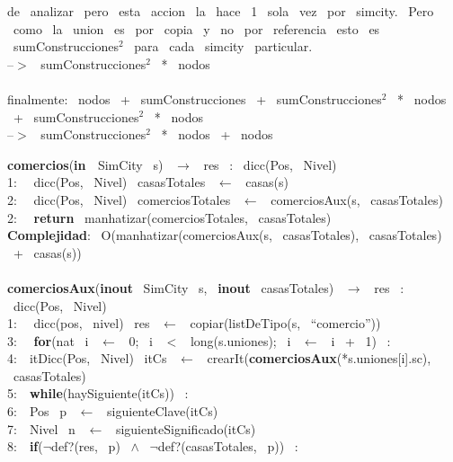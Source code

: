 \begin{Algoritmos}
    de \ analizar \ pero \ esta \ accion \ la \ hace \ 1 \ sola \ vez \ por \ simcity. \ Pero \ como \ la \ union \ es \ por \ copia \ y \ no \ por \
    referencia \ esto \ es \ sumConstrucciones$^2$ \ para \ cada \ simcity \ particular.\\
    --$>$ \ sumConstrucciones$^2$ \ * \ nodos\\
    \\
    finalmente: \ nodos \ + \ sumConstrucciones \ + \ sumConstrucciones$^2$ \ * \ nodos \ + \ sumConstrucciones$^2$ \ * \ nodos\\
    --$>$ \ sumConstrucciones$^2$ \ * \ nodos \ + \ nodos\\
    \makebox[\linewidth]{\rule{\textwidth}{0.4pt}} 

    \noindent\makebox[\linewidth]{\rule{\textwidth}{0.4pt}}
    \textbf{comercios}(\textbf{in \ }SimCity \ s) \ $\rightarrow $ \ res \ : \ dicc(Pos, \ Nivel)\\
    1: \  \ dicc(Pos, \ Nivel) \ casasTotales \ $\leftarrow$ \ casas(s)\\
    2: \  \ dicc(Pos, \ Nivel) \ comerciosTotales \ $\leftarrow$ \ comerciosAux(s, \ casasTotales)\\
    2: \  \ \textbf{return} \ manhatizar(comerciosTotales, \ casasTotales)\\
    \textbf{Complejidad}: \ O(manhatizar(comerciosAux(s, \ casasTotales), \ casasTotales) \ + \ casas(s))\\
    \\
    \textbf{comerciosAux}(\textbf{inout} \ SimCity \ s, \ \textbf{inout} \ casasTotales) \ $\rightarrow $ \ res \ : \ dicc(Pos, \ Nivel)\\
    1: \  \ dicc(pos, \ nivel) \ res \ $\leftarrow$ \ copiar(listDeTipo(s, \ ``comercio''))\\
    3: \  \ \textbf{for}(nat \ i \ $\leftarrow$ \ 0; \ i \ $<$ \ long(s.uniones); \ i \ $\leftarrow$ \ i \ + \ 1) \ : \ \\
    4:\indent  \  \ itDicc(Pos, \ Nivel) \ itCs \ $\leftarrow$ \ crearIt(\textbf{comerciosAux}(*s.uniones[i].sc), \ casasTotales)\\
    5:\indent  \  \ \textbf{while}(haySiguiente(itCs)) \ :\\
    6:\indent \indent  \  \ Pos \ p \ $\leftarrow$ \ siguienteClave(itCs)\\
    7:\indent \indent  \  \ Nivel \ n \ $\leftarrow$ \ siguienteSignificado(itCs)\\
    8:\indent \indent  \  \ \textbf{if}($\neg$def?(res, \ p) \ $\wedge$ \ $\neg$def?(casasTotales, \ p)) \ :\\

\end{Algoritmos}
